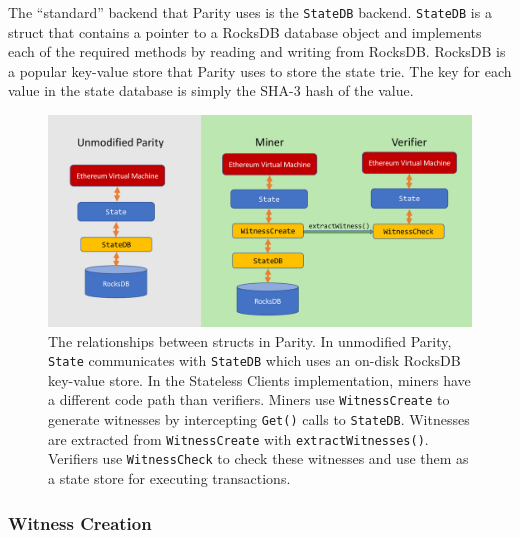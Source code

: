\documentclass[12pt]{article}
\newcommand{\System}{Stateless Clients\xspace}
\begin{document}
The ``standard'' backend that Parity uses is the \texttt{StateDB} backend. \texttt{StateDB} is a struct that contains a pointer to a RocksDB database object and implements each of the required methods by reading and writing from RocksDB. RocksDB is a popular key-value store that Parity uses to store the state trie. The key for each value in the state database is simply the SHA-3 hash of the value.

\begin{figure}[H]
  \centering
  \includegraphics[width=\textwidth]{../figures/implementation/code_layout.pdf}
  \caption{The relationships between structs in Parity. In unmodified Parity, \texttt{State} communicates with \texttt{StateDB} which uses an on-disk RocksDB key-value store. In the \System implementation, miners have a different code path than verifiers. Miners use \texttt{WitnessCreate} to generate witnesses by intercepting \texttt{Get()} calls to \texttt{StateDB}. Witnesses are extracted from \texttt{WitnessCreate} with \texttt{extractWitnesses()}. Verifiers use \texttt{WitnessCheck} to check these witnesses and use them as a state store for executing transactions.}
  \label{fig:parityrelationships}
\end{figure}

\subsubsection{Witness Creation}
\end{document}
